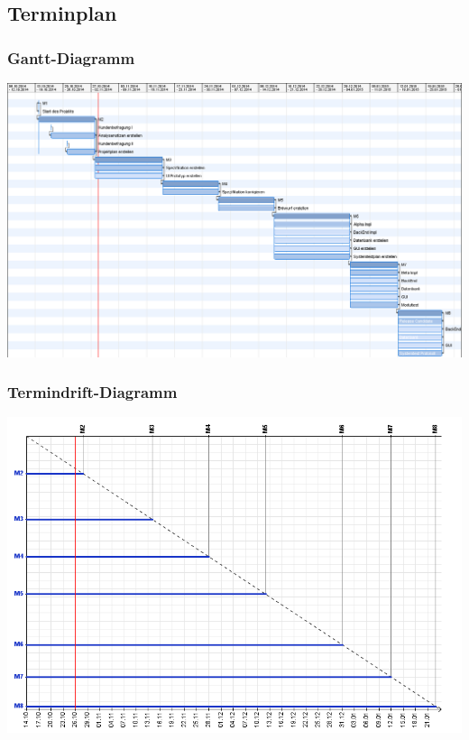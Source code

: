 \documentclass[11pt]{article}
\begin{document}
\subsection{Terminplan}

\subsubsection{Gantt-Diagramm}

\begin{center}
	\includegraphics[width=1.0\textwidth]{Tourney.png}
\end{center}

\subsubsection{Termindrift-Diagramm}

\begin{center}
	\includegraphics[width=1.1\textwidth]{TerminDriftCropped.png}
\end{center}
\end{document}

